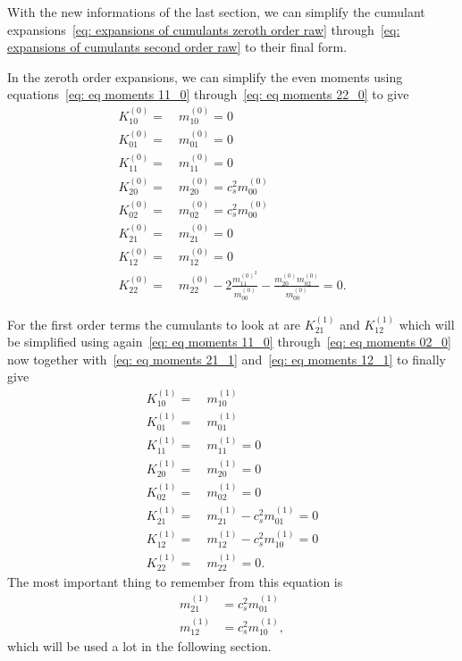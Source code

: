 With the new informations of the last section, we can simplify the cumulant expansions~\eqref{eq: expansions of cumulants zeroth order raw} through~\eqref{eq: expansions of cumulants second order raw} to their final form.

In the zeroth order expansions, we can simplify the even moments using equations~\eqref{eq: eq moments 11_0} through~\eqref{eq: eq moments 22_0} to give
\begin{equation}
  \label{eq: expansions of cumulants zeroth order}
  \begin{aligned}
    K_{10}^{(0)} =&\ m_{10}^{(0)} = 0\\
    K_{01}^{(0)} =&\ m_{01}^{(0)} = 0\\
    K_{11}^{(0)} =&\ m_{11}^{(0)} = 0\\
    K_{20}^{(0)} =&\ m_{20}^{(0)} = c_s^2 m_{00}^{(0)}\\
    K_{02}^{(0)} =&\ m_{02}^{(0)} = c_s^2 m_{00}^{(0)}\\
    K_{21}^{(0)} =&\ m_{21}^{(0)} = 0\\
    K_{12}^{(0)} =&\ m_{12}^{(0)} = 0\\
    K_{22}^{(0)} =&\ m_{22}^{(0)}
    - 2\frac{ m_{11}^{{(0)}^2}}{m_{00}^{(0)}}
    - \frac{ m_{20}^{(0)} m_{02}^{(0)} }{m_{00}^{(0)}}
    = 0.
  \end{aligned}
\end{equation}

For the first order terms the cumulants to look at are $K_{21}^{(1)}$ and $K_{12}^{(1)}$ which will be simplified using
again~\eqref{eq: eq moments 11_0} through~\eqref{eq: eq moments 02_0}
now together with~\eqref{eq: eq moments 21_1} and~\eqref{eq: eq moments 12_1} to finally give
\begin{equation}
  \label{eq: expansions of cumulants first order}
  \begin{aligned}
    K_{10}^{(1)} =&\ m_{10}^{(1)}\\
    K_{01}^{(1)} =&\ m_{01}^{(1)}\\
    K_{11}^{(1)} =&\ m_{11}^{(1)} = 0 \\
    K_{20}^{(1)} =&\ m_{20}^{(1)} = 0\\
    K_{02}^{(1)} =&\ m_{02}^{(1)} = 0\\
    K_{21}^{(1)} =&\ m_{21}^{(1)}
    - c_s^2 m_{01}^{(1)} = 0 \\
    K_{12}^{(1)} =&\ m_{12}^{(1)}
    - c_s^2 m_{10}^{(1)} = 0 \\
    K_{22}^{(1)} =&\ m_{22}^{(1)} = 0.
  \end{aligned}
\end{equation}
The most important thing to remember from this equation is
\begin{equation}
  \label{eq: aliasing 21 and 12}
  \begin{aligned}
    m_{21}^{(1)} &= c_s^2 m_{01}^{(1)} \\
    m_{12}^{(1)} &= c_s^2 m_{10}^{(1)},
  \end{aligned}
\end{equation}
which will be used a lot in the following section.

